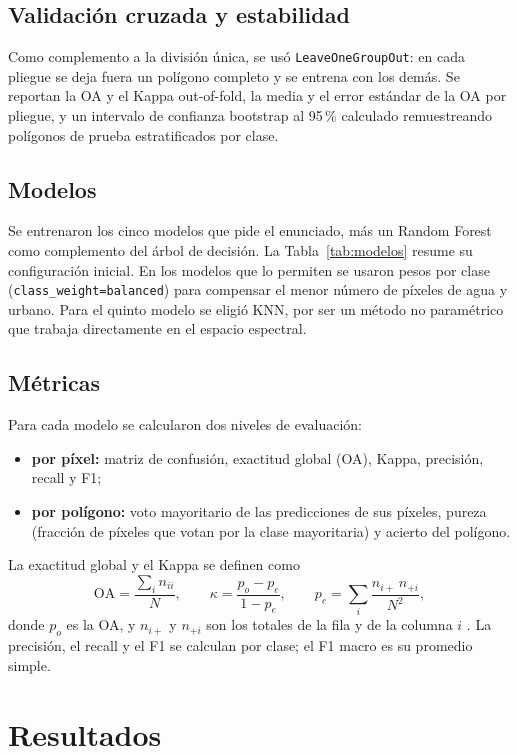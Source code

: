 \documentclass{article}
\begin{document}
\subsection{Validación cruzada y estabilidad}
Como complemento a la división única, se usó \texttt{LeaveOneGroupOut}: en cada pliegue se deja fuera un polígono completo y se entrena con los demás. Se reportan la OA y el Kappa out-of-fold, la media y el error estándar de la OA por pliegue, y un intervalo de confianza bootstrap al 95\,\% calculado remuestreando polígonos de prueba estratificados por clase.

\subsection{Modelos}
Se entrenaron los cinco modelos que pide el enunciado, más un Random Forest como complemento del árbol de decisión. La Tabla~\ref{tab:modelos} resume su configuración inicial. En los modelos que lo permiten se usaron pesos por clase (\texttt{class\_weight=balanced}) para compensar el menor número de píxeles de agua y urbano. Para el quinto modelo se eligió KNN, por ser un método no paramétrico que trabaja directamente en el espacio espectral.



\subsection{Métricas}
Para cada modelo se calcularon dos niveles de evaluación:
\begin{itemize}
 \item \textbf{por píxel:} matriz de confusión, exactitud global (OA), Kappa, precisión, recall y F1;
 \item \textbf{por polígono:} voto mayoritario de las predicciones de sus píxeles, pureza (fracción de píxeles que votan por la clase mayoritaria) y acierto del polígono.
\end{itemize}
La exactitud global y el Kappa se definen como
\begin{equation}
 \mathrm{OA} = \frac{\sum_{i} n_{ii}}{N}, \qquad
 \kappa = \frac{p_o - p_e}{1 - p_e}, \qquad
 p_e = \sum_{i} \frac{n_{i+}\, n_{+i}}{N^2},
\end{equation}
donde $p_o$ es la OA, y $n_{i+}$ y $n_{+i}$ son los totales de la fila y de la columna $i$ \parencite{Cohen1960}. La precisión, el recall y el F1 se calculan por clase; el F1 macro es su promedio simple.

\section{Resultados}
\end{document}
